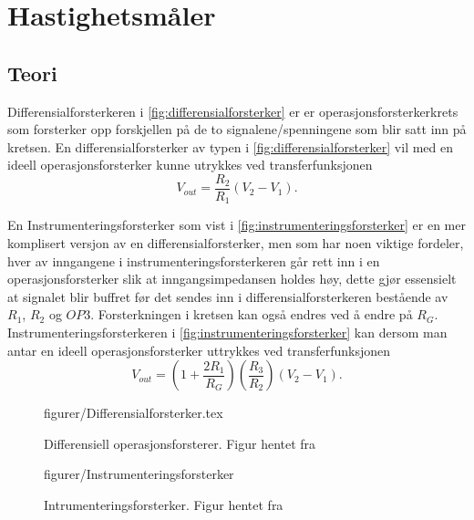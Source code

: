 \section{Hastighetsmåler}
\subsection{Teori}
Differensialforsterkeren i \autoref{fig:differensialforsterker} er er operasjonsforsterkerkrets som forsterker opp forskjellen på de to signalene/spenningene som blir satt inn på kretsen. En differensialforsterker av typen i \autoref{fig:differensialforsterker} vil med en ideell operasjonsforsterker kunne utrykkes ved transferfunksjonen \cite{Johnson}
\begin{equation}
    V_{out} = \frac{R_2}{R_1}(V_2-V_1).
    \label{eq:differensialforsterker}
\end{equation}

En Instrumenteringsforsterker som vist i \autoref{fig:instrumenteringsforsterker} er en mer komplisert versjon av en differensialforsterker, men som har noen viktige fordeler, hver av inngangene i instrumenteringsforsterkeren går rett inn i en operasjonsforsterker slik at inngangsimpedansen holdes høy, dette gjør essensielt at signalet blir buffret før det sendes inn i differensialforsterkeren bestående av $R_1$, $R_2$ og $OP3$. Forsterkningen i kretsen kan også endres ved å endre på $R_G$. Instrumenteringsforsterkeren i \autoref{fig:instrumenteringsforsterker} kan dersom man antar en ideell operasjonsforsterker uttrykkes ved transferfunksjonen \cite{Johnson}
\begin{equation}
    V_{out} = (1+\frac{2R_1}{R_G})(\frac{R_3}{R_2})(V_2-V_1).
    \label{eq:instrumenteringsforsterker}
\end{equation}


\begin{figure} [h]
    \centering
     {figurer/Differensialforsterker.tex}
    \caption{Differensiell operasjonsforsterer. Figur hentet fra \cite{Johnson}}
    \label{fig:differensialforsterker}
\end{figure}


\begin{figure} [h]
    \centering
     {figurer/Instrumenteringsforsterker}
    \caption{Intrumenteringsforsterker. Figur hentet fra \cite{Johnson}}
    \label{fig:instrumenteringsforsterker}
\end{figure}








